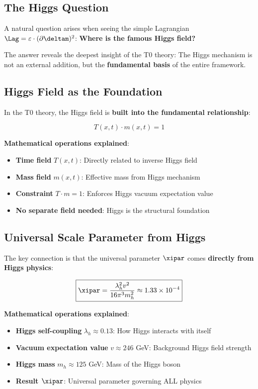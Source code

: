 	\subsection{The Higgs Question}
	
	A natural question arises when seeing the simple Lagrangian $\Lag = \varepsilon \cdot (\partial \deltam)^2$: \textbf{Where is the famous Higgs field?}
	
	The answer reveals the deepest insight of the T0 theory: The Higgs mechanism is not an external addition, but the \textbf{fundamental basis} of the entire framework.
	
	\subsection{Higgs Field as the Foundation}
	
	In the T0 theory, the Higgs field is \textbf{built into the fundamental relationship}:
	
	\begin{equation}
		\boxed{T(x,t) \cdot m(x,t) = 1}
		\label{eq:higgs_foundation}
	\end{equation}
	
	\textbf{Mathematical operations explained}:
	\begin{itemize}
		\item \textbf{Time field} $T(x,t)$: Directly related to inverse Higgs field
		\item \textbf{Mass field} $m(x,t)$: Effective mass from Higgs mechanism
		\item \textbf{Constraint} $T \cdot m = 1$: Enforces Higgs vacuum expectation value
		\item \textbf{No separate field needed}: Higgs is the structural foundation
	\end{itemize}
	
	\subsection{Universal Scale Parameter from Higgs}
	
	The key connection is that the universal parameter $\xipar$ comes \textbf{directly from Higgs physics}:
	
	\begin{equation}
		\boxed{\xipar = \frac{\lambda_h^2 v^2}{16\pi^3 m_h^2} \approx 1.33 \times 10^{-4}}
		\label{eq:xi_from_higgs}
	\end{equation}
	
	\textbf{Mathematical operations explained}:
	\begin{itemize}
		\item \textbf{Higgs self-coupling} $\lambda_h \approx 0.13$: How Higgs interacts with itself
		\item \textbf{Vacuum expectation value} $v \approx 246$ GeV: Background Higgs field strength
		\item \textbf{Higgs mass} $m_h \approx 125$ GeV: Mass of the Higgs boson
		\item \textbf{Result $\xipar$}: Universal parameter governing ALL physics
	\end{itemize}
	
